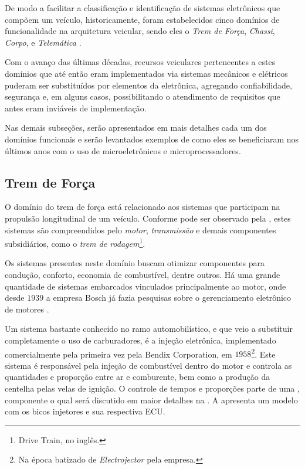 De modo a facilitar a classificação e identificação de sistemas eletrônicos que compõem um veículo, historicamente, foram estabelecidos cinco domínios de funcionalidade na arquitetura veicular, sendo eles o \emph{Trem de Força}, \emph{Chassi}, \emph{Corpo},  e \emph{Telemática} \cite{Auto:Lion2008}.

Com o avanço das últimas décadas, recursos veiculares pertencentes a estes domínios que até então eram implementados via sistemas mecânicos e elétricos puderam ser substituídos por elementos da eletrônica, agregando confiabilidade, segurança e, em alguns casos, possibilitando o atendimento de requisitos que antes eram inviáveis de implementação.

Nas demais subseções, serão apresentados em mais detalhes cada um dos domínios funcionais e serão levantados exemplos de como eles se beneficiaram nos últimos anos com o uso de microeletrônicos e microprocessadores.

\subsection{Trem de Força}

O domínio do trem de força está relacionado aos sistemas que participam na propulsão longitudinal de um veículo. Conforme pode ser observado pela , estes sistemas são compreendidos pelo \emph{motor}, \emph{transmissão} e demais componentes subsidiários, como o \emph{trem de rodagem}\footnote{Drive Train, no inglês.}.


Os sistemas presentes neste domínio buscam otimizar componentes para condução, conforto, economia de combustível, dentre outros. Há uma grande quantidade de sistemas embarcados vinculados principalmente ao motor, onde desde $1939$ a empresa Bosch já fazia pesquisas sobre o gerenciamento eletrônico de motores \cite{BoschHistory}.

Um sistema bastante conhecido no ramo automobilístico, e que veio a substituir completamente o uso de carburadores, é a injeção eletrônica, implementado comercialmente pela primeira vez pela Bendix Corporation, em $1958$\footnote{Na época batizado de \emph{Electrojector} pela empresa.}\cite{Electrojector}. Este sistema é responsável pela injeção de combustível dentro do motor e controla as quantidades e proporção entre ar e comburente, bem como a produção da centelha pelas velas de ignição. O controle de tempos e proporções parte de uma , componente o qual será discutido em maior detalhes na . A  apresenta um modelo com os bicos injetores e sua respectiva ECU.

